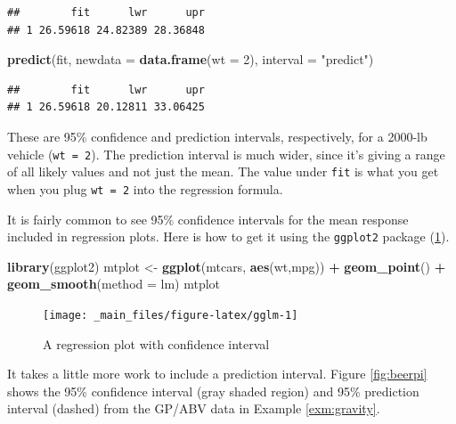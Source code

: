 \documentclass[
]{book}
\newenvironment{Shaded}{\begin{snugshade}}{\end{snugshade}}
\newcommand{\AttributeTok}[1]{\textcolor[rgb]{0.13,0.29,0.53}{#1}}
\newcommand{\DecValTok}[1]{\textcolor[rgb]{0.00,0.00,0.81}{#1}}
\newcommand{\FunctionTok}[1]{\textcolor[rgb]{0.13,0.29,0.53}{\textbf{#1}}}
\newcommand{\NormalTok}[1]{#1}
\newcommand{\OtherTok}[1]{\textcolor[rgb]{0.56,0.35,0.01}{#1}}
\newcommand{\SpecialCharTok}[1]{\textcolor[rgb]{0.81,0.36,0.00}{\textbf{#1}}}
\newcommand{\StringTok}[1]{\textcolor[rgb]{0.31,0.60,0.02}{#1}}
\theoremstyle{definition}
\theoremstyle{definition}
\theoremstyle{definition}
\theoremstyle{definition}
\theoremstyle{remark}
\begin{document}
\begin{verbatim}
##        fit      lwr      upr
## 1 26.59618 24.82389 28.36848
\end{verbatim}

\begin{Shaded}
\begin{Highlighting}[]
\FunctionTok{predict}\NormalTok{(fit, }\AttributeTok{newdata =} \FunctionTok{data.frame}\NormalTok{(}\AttributeTok{wt =} \DecValTok{2}\NormalTok{), }\AttributeTok{interval =} \StringTok{"predict"}\NormalTok{)}
\end{Highlighting}
\end{Shaded}

\begin{verbatim}
##        fit      lwr      upr
## 1 26.59618 20.12811 33.06425
\end{verbatim}

These are 95\% confidence and prediction intervals, respectively, for a 2000-lb vehicle (\texttt{wt\ =\ 2}). The prediction interval is much wider, since it's giving a range of all likely values and not just the mean. The value under \texttt{fit} is what you get when you plug \texttt{wt\ =\ 2} into the regression formula.

It is fairly common to see 95\% confidence intervals for the mean response included in regression plots. Here is how to get it using the \texttt{ggplot2} package (\ref{fig:gglm}).

\begin{Shaded}
\begin{Highlighting}[]
\FunctionTok{library}\NormalTok{(ggplot2)}
\NormalTok{mtplot }\OtherTok{\textless{}{-}} \FunctionTok{ggplot}\NormalTok{(mtcars, }\FunctionTok{aes}\NormalTok{(wt,mpg)) }\SpecialCharTok{+} \FunctionTok{geom\_point}\NormalTok{() }\SpecialCharTok{+}  
          \FunctionTok{geom\_smooth}\NormalTok{(}\AttributeTok{method =} \StringTok{\textquotesingle{}lm\textquotesingle{}}\NormalTok{)}
\NormalTok{mtplot}
\end{Highlighting}
\end{Shaded}

\begin{figure}

{\centering \texttt{[image: \_main\_files/figure-latex/gglm-1]} 

}

\caption{A regression plot with confidence interval}\label{fig:gglm}
\end{figure}

It takes a little more work to include a prediction interval. Figure \ref{fig:beerpi} shows the 95\% confidence interval (gray shaded region) and 95\% prediction interval (dashed) from the GP/ABV data in Example \ref{exm:gravity}.
\end{document}
